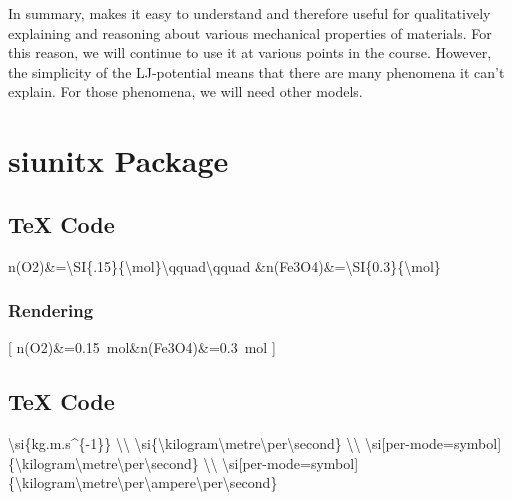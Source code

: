 \documentclass{book}
\newenvironment{Shaded}{}{}
\newcommand{\FunctionTok}[1]{\textcolor[rgb]{0.02,0.16,0.49}{#1}}
\newcommand{\NormalTok}[1]{#1}
\begin{document}
In summary, makes it easy to understand and therefore useful for qualitatively
explaining and reasoning about various mechanical properties of materials. For
this reason, we will continue to use it at various points in the course.
However, the simplicity of the LJ-potential means that there are many
phenomena it can't explain. For those phenomena, we will need other models.

\hypertarget{siunitx-package}{%
\chapter{siunitx Package}\label{siunitx-package}}

\hypertarget{tex-code}{%
\section{TeX Code}\label{tex-code}}

\begin{Shaded}
\begin{Highlighting}[]
\NormalTok{ n(O2)\&=}\FunctionTok{\textbackslash{}SI}\NormalTok{\{.15\}\{}\FunctionTok{\textbackslash{}mol}\NormalTok{\}}\FunctionTok{\textbackslash{}qquad\textbackslash{}qquad}\NormalTok{ \&n(Fe3O4)\&=}\FunctionTok{\textbackslash{}SI}\NormalTok{\{0.3\}\{}\FunctionTok{\textbackslash{}mol}\NormalTok{\}}
\end{Highlighting}
\end{Shaded}

\hypertarget{rendering}{%
\subsection{Rendering}\label{rendering}}

{[} n(O2)\&=\SI{.15}{\mol}\qquad\qquad\&n(Fe3O4)\&=\SI{0.3}{\mol} {]}

\hypertarget{tex-code-1}{%
\section{TeX Code}\label{tex-code-1}}

\begin{Shaded}
\begin{Highlighting}[]
  \FunctionTok{\textbackslash{}si}\NormalTok{\{kg.m.s\^{}\{{-}1\}\}                }\FunctionTok{\textbackslash{}\textbackslash{}}
  \FunctionTok{\textbackslash{}si}\NormalTok{\{}\FunctionTok{\textbackslash{}kilogram\textbackslash{}metre\textbackslash{}per\textbackslash{}second}\NormalTok{\} }\FunctionTok{\textbackslash{}\textbackslash{}}
  \FunctionTok{\textbackslash{}si}\NormalTok{[per{-}mode=symbol]}
\NormalTok{    \{}\FunctionTok{\textbackslash{}kilogram\textbackslash{}metre\textbackslash{}per\textbackslash{}second}\NormalTok{\}  }\FunctionTok{\textbackslash{}\textbackslash{}}
  \FunctionTok{\textbackslash{}si}\NormalTok{[per{-}mode=symbol]}
\NormalTok{    \{}\FunctionTok{\textbackslash{}kilogram\textbackslash{}metre\textbackslash{}per\textbackslash{}ampere\textbackslash{}per\textbackslash{}second}\NormalTok{\}}
\end{Highlighting}
\end{Shaded}
\end{document}
